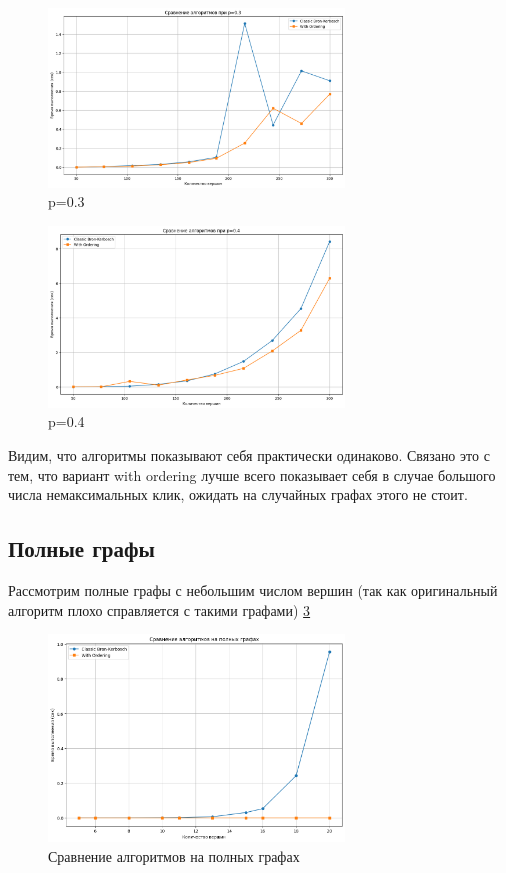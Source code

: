 \documentclass{article}
\begin{document}
\begin{figure}[htbp]
  \centering
  \includegraphics[width=0.7\textwidth]{image/rand2.png}
  \caption{p=0.3}
  \label{fig:rand2}
\end{figure}

\begin{figure}[htbp]
  \centering
  \includegraphics[width=0.7\textwidth]{image/rand3.png}
  \caption{p=0.4}
  \label{fig:rand3}
\end{figure}

Видим, что алгоритмы показывают себя практически одинаково. Связано это с тем, что вариант with ordering лучше всего показывает себя в случае большого числа немаксимальных клик, ожидать на случайных графах этого не стоит.

\subsection{Полные графы}
Рассмотрим полные графы с небольшим числом вершин (так как оригинальный алгоритм плохо справляется с такими графами) \ref{fig:rand4}
\begin{figure}[htbp]
  \centering
  \includegraphics[width=0.7\textwidth]{image/complete_all.png}
  \caption{Сравнение алгоритмов на полных графах}
  \label{fig:rand4}
\end{figure}
\end{document}
